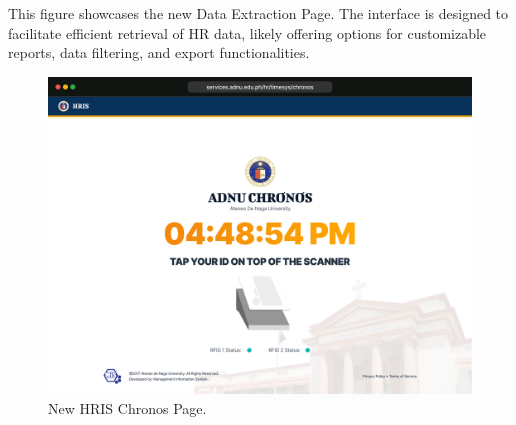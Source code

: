     This figure showcases the new Data Extraction Page. The interface is designed to facilitate efficient retrieval of HR data, likely offering options for customizable reports, data filtering, and export functionalities.

    \begin{figure}[H]
        \centering
        \includegraphics[width=1\linewidth]{figures/app/chronos.png}
        \caption{New HRIS Chronos Page.}
        \label{fig:app-chronos}
    \end{figure}